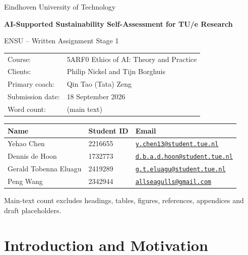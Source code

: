 \documentclass[11pt,a4paper]{article}
\begin{document}
\hypersetup{pageanchor=false}
\begin{titlepage}
\centering
\vspace*{3cm}
{\Large Eindhoven University of Technology\par}
\vspace{1.5cm}
{\huge\bfseries AI-Supported Sustainability Self-Assessment for TU/e Research\par}
\vspace{0.6cm}
{\Large ENSU -- Written Assignment Stage 1\par}
\vfill
\begin{tabularx}{0.95\textwidth}{@{}lX@{}}
Course: & 5ARF0 Ethics of AI: Theory and Practice \\
Clients: & Philip Nickel and Tijn Borghuis \\
Primary coach: & Qin Tao (Tata) Zeng \\
Submission date: & 18 September 2026 \\
Word count: & \mainwordcount{} (main text)
\end{tabularx}

\vspace{1cm}
\begin{tabularx}{0.95\textwidth}{@{}p{}p{}X@{}}
\toprule
Name & Student ID & Email \\
\midrule
Yehao Chen & 2216655 & \href{mailto:y.chen13@student.tue.nl}{\nolinkurl{y.chen13@student.tue.nl}} \\
Dennis de Hoon & 1732773 & \href{mailto:d.b.a.d.hoon@student.tue.nl}{\nolinkurl{d.b.a.d.hoon@student.tue.nl}} \\
Gerald Tobenna Eluagu & 2419289 & \href{mailto:g.t.eluagu@student.tue.nl}{\nolinkurl{g.t.eluagu@student.tue.nl}} \\
Peng Wang & 2342944 & \href{mailto:p.wang1@student.tue.nl}{\nolinkurl{allseagulls@gmail.com}} \\
\bottomrule
\end{tabularx}

\vspace{0.6cm}
{\footnotesize Main-text count excludes headings, tables, figures, references, appendices and draft placeholders.\par}

\vfill
\end{titlepage}
\hypersetup{pageanchor=true}

\section{Introduction and Motivation}
\end{document}
